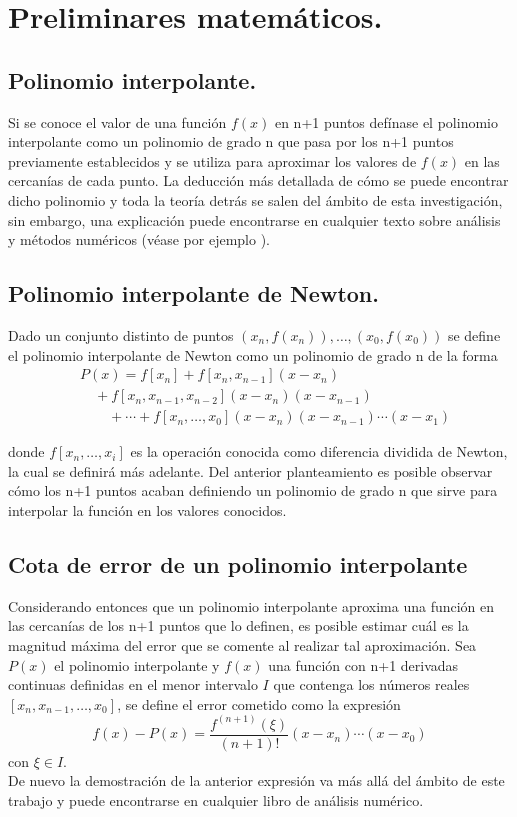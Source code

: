 \section{Preliminares matemáticos.}
\subsection{Polinomio interpolante.}
Si se conoce el valor de una función $f(x)$ en n+1 puntos defínase el polinomio
interpolante como un polinomio de grado n que pasa por los n+1 puntos
previamente establecidos y se utiliza para aproximar los valores de $f(x)$ en las cercanías de cada punto.
La deducción más detallada de cómo se puede encontrar dicho polinomio y toda la teoría detrás
se salen del ámbito de esta investigación, sin embargo, una explicación puede encontrarse en cualquier texto
sobre análisis y métodos numéricos (véase por ejemplo \cite{atkinson1989introduction}).
\subsection{Polinomio interpolante de Newton.}
\begin{definition}
    \label{newton_poly}
    Dado un conjunto distinto de puntos $(x_n,f(x_n)),\ldots,(x_0,f(x_0))$ se define
    el polinomio interpolante de Newton como un polinomio de grado n de la forma
    \begin{equation}
        \begin{split}
            &P(x) =f[x_n]+f[x_n,x_{n-1}](x-x_n)\\
            &\quad +f[x_n,x_{n-1},x_{n-2}](x-x_n)(x-x_{n-1})\\
            &\qquad + \cdots + f[x_n,\ldots,x_0](x-x_n)(x-x_{n-1})\cdots(x-x_1) 
        \end{split} 
    \end{equation}  
\end{definition}
donde $f[x_n,\ldots,x_i]$ es la operación conocida como diferencia dividida de Newton,
la cual se definirá más adelante. Del anterior planteamiento es posible observar cómo
los n+1 puntos acaban definiendo un polinomio de grado n que sirve para interpolar
la función en los valores conocidos.
\subsection{Cota de error de un polinomio interpolante}
Considerando entonces que un polinomio interpolante aproxima una función 
en las cercanías de los n+1 puntos que lo definen, es posible estimar cuál es
la magnitud máxima del error que se comente al realizar tal aproximación. Sea $P(x)$ el
polinomio interpolante y $f(x)$ una función con n+1 derivadas continuas definidas en el menor intervalo $I$ que contenga los números reales $[x_n,x_{n-1},\ldots,x_0]$,
se define el error cometido como la expresión
\begin{equation}
    \label{lagrange_error}
    f(x)-P(x)=\frac{f^{\left(n+1\right)}(\xi)}{(n+1)!}(x-x_n)\cdots(x-x_0)
\end{equation}
con $\xi \in I$. \\De nuevo la demostración de la anterior expresión
va más allá del ámbito de este trabajo y puede encontrarse en cualquier
libro de análisis numérico.
